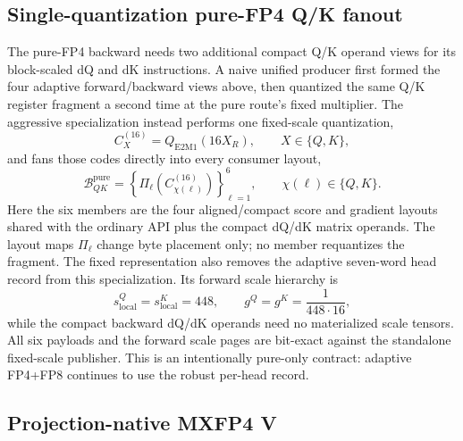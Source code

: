\subsection{Single-quantization pure-FP4 Q/K fanout}

The pure-FP4 backward needs two additional compact Q/K operand views for its
block-scaled dQ and dK instructions.  A naive unified producer first formed
the four adaptive forward/backward views above, then quantized the same Q/K
register fragment a second time at the pure route's fixed multiplier.  The
aggressive specialization instead performs one fixed-scale quantization,
\begin{equation}
  C_X^{(16)}=Q_{\mathrm{E2M1}}(16X_R),\qquad X\in\{Q,K\},
  \label{eq:pure-projection-single-quant}
\end{equation}
and fans those codes directly into every consumer layout,
\begin{equation}
  \mathcal B_{QK}^{\mathrm{pure}}
  =\left\{\Pi_\ell\!\left(C_{\chi(\ell)}^{(16)}\right)\right\}_{\ell=1}^{6},
  \qquad \chi(\ell)\in\{Q,K\}.
  \label{eq:pure-projection-layout-fanout}
\end{equation}
Here the six members are the four aligned/compact score and gradient layouts
shared with the ordinary API plus the compact dQ/dK matrix operands.  The
layout maps $\Pi_\ell$ change byte placement only; no member requantizes the
fragment.  The fixed representation also removes the adaptive seven-word
head record from this specialization.  Its forward scale hierarchy is
\begin{equation}
  s^Q_{\mathrm{local}}=s^K_{\mathrm{local}}=448,
  \qquad g^Q=g^K=\frac{1}{448\cdot16},
  \label{eq:pure-projection-forward-scales}
\end{equation}
while the compact backward dQ/dK operands need no materialized scale tensors.
All six payloads and the forward scale pages are bit-exact against the
standalone fixed-scale publisher.  This is an intentionally pure-only
contract: adaptive FP4+FP8 continues to use the robust per-head record.

\subsection{Projection-native MXFP4 V}

